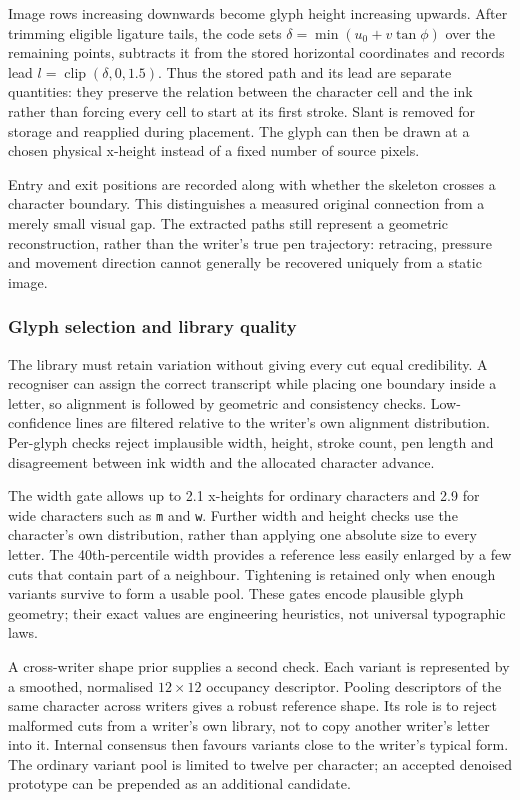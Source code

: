 Image rows increasing downwards become glyph height increasing upwards. After trimming eligible ligature tails, the code sets $\delta=\min(u_0+v\tan\phi)$ over the remaining points, subtracts it from the stored horizontal coordinates and records lead $l=\operatorname{clip}(\delta,0,1.5)$. Thus the stored path and its lead are separate quantities: they preserve the relation between the character cell and the ink rather than forcing every cell to start at its first stroke. Slant is removed for storage and reapplied during placement. The glyph can then be drawn at a chosen physical x-height instead of a fixed number of source pixels.

Entry and exit positions are recorded along with whether the skeleton crosses a character boundary. This distinguishes a measured original connection from a merely small visual gap. The extracted paths still represent a geometric reconstruction, rather than the writer's true pen trajectory: retracing, pressure and movement direction cannot generally be recovered uniquely from a static image.

\subsubsection{Glyph selection and library quality}
The library must retain variation without giving every cut equal credibility. A recogniser can assign the correct transcript while placing one boundary inside a letter, so alignment is followed by geometric and consistency checks. Low-confidence lines are filtered relative to the writer's own alignment distribution. Per-glyph checks reject implausible width, height, stroke count, pen length and disagreement between ink width and the allocated character advance.


The width gate allows up to 2.1 x-heights for ordinary characters and 2.9 for wide characters such as \texttt{m} and \texttt{w}. Further width and height checks use the character's own distribution, rather than applying one absolute size to every letter. The 40th-percentile width provides a reference less easily enlarged by a few cuts that contain part of a neighbour. Tightening is retained only when enough variants survive to form a usable pool. These gates encode plausible glyph geometry; their exact values are engineering heuristics, not universal typographic laws.

A cross-writer shape prior supplies a second check. Each variant is represented by a smoothed, normalised $12\times12$ occupancy descriptor. Pooling descriptors of the same character across writers gives a robust reference shape. Its role is to reject malformed cuts from a writer's own library, not to copy another writer's letter into it. Internal consensus then favours variants close to the writer's typical form. The ordinary variant pool is limited to twelve per character; an accepted denoised prototype can be prepended as an additional candidate.

